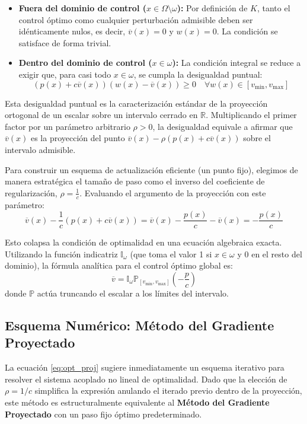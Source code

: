 \documentclass[11pt,a4paper]{article}
\begin{document}
	\begin{itemize}
		\item \textbf{Fuera del dominio de control ($x \in \Omega \setminus \omega$):} Por definición de $K$, tanto el control óptimo como cualquier perturbación admisible deben ser idénticamente nulos, es decir, $\overline{v}(x) = 0$ y $w(x) = 0$. La condición se satisface de forma trivial.
		\item \textbf{Dentro del dominio de control ($x \in \omega$):} La condición integral se reduce a exigir que, para casi todo $x \in \omega$, se cumpla la desigualdad puntual:
		\begin{equation*}
			(p(x) + c\overline{v}(x))(w(x) - \overline{v}(x)) \ge 0 \quad \forall w(x) \in [v_{\min}, v_{\max}]
		\end{equation*}
	\end{itemize}
	
	Esta desigualdad puntual es la caracterización estándar de la proyección ortogonal de un escalar sobre un intervalo cerrado en $\mathbb{R}$. Multiplicando el primer factor por un parámetro arbitrario $\rho > 0$, la desigualdad equivale a afirmar que $\overline{v}(x)$ es la proyección del punto $\overline{v}(x) - \rho(p(x) + c\overline{v}(x))$ sobre el intervalo admisible.
	
	Para construir un esquema de actualización eficiente (un punto fijo), elegimos de manera estratégica el tamaño de paso como el inverso del coeficiente de regularización, $\rho = \frac{1}{c}$. Evaluando el argumento de la proyección con este parámetro:
	\begin{equation*}
		\overline{v}(x) - \frac{1}{c}(p(x) + c\overline{v}(x)) = \overline{v}(x) - \frac{p(x)}{c} - \overline{v}(x) = -\frac{p(x)}{c}
	\end{equation*}
	
	Esto colapsa la condición de optimalidad en una ecuación algebraica exacta. Utilizando la función indicatriz $\mathbb{I}_\omega$ (que toma el valor 1 si $x \in \omega$ y 0 en el resto del dominio), la fórmula analítica para el control óptimo global es:
	\begin{equation} \label{eq:opt_proj}
		\overline{v} = \mathbb{I}_\omega \mathbb{P}_{[v_{\min}, v_{\max}]} \left( -\frac{p}{c} \right)
	\end{equation}
	donde $\mathbb{P}$ actúa truncando el escalar a los límites del intervalo.
	
	\subsection{Esquema Numérico: Método del Gradiente Proyectado}
	La ecuación \eqref{eq:opt_proj} sugiere inmediatamente un esquema iterativo para resolver el sistema acoplado no lineal de optimalidad. Dado que la elección de $\rho = 1/c$ simplifica la expresión anulando el iterado previo dentro de la proyección, este método es estructuralmente equivalente al \textbf{Método del Gradiente Proyectado} con un paso fijo óptimo predeterminado.
	
\end{document}
